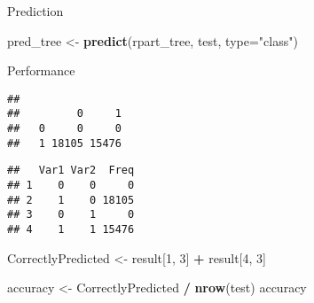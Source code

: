 \documentclass[]{article}
\newenvironment{Shaded}{\begin{snugshade}}{\end{snugshade}}
\newcommand{\KeywordTok}[1]{\textcolor[rgb]{0.13,0.29,0.53}{\textbf{#1}}}
\newcommand{\DataTypeTok}[1]{\textcolor[rgb]{0.13,0.29,0.53}{#1}}
\newcommand{\DecValTok}[1]{\textcolor[rgb]{0.00,0.00,0.81}{#1}}
\newcommand{\StringTok}[1]{\textcolor[rgb]{0.31,0.60,0.02}{#1}}
\newcommand{\OperatorTok}[1]{\textcolor[rgb]{0.81,0.36,0.00}{\textbf{#1}}}
\newcommand{\NormalTok}[1]{#1}
\begin{document}
Prediction

\begin{Shaded}
\begin{Highlighting}[]
\NormalTok{pred_tree <-}\StringTok{ }\KeywordTok{predict}\NormalTok{(rpart_tree, test, }\DataTypeTok{type=}\StringTok{"class"}\NormalTok{)}
\end{Highlighting}
\end{Shaded}

Performance

\begin{Shaded}
\end{Shaded}

\begin{verbatim}
##    
##         0     1
##   0     0     0
##   1 18105 15476
\end{verbatim}

\begin{Shaded}
\end{Shaded}

\begin{verbatim}
##   Var1 Var2  Freq
## 1    0    0     0
## 2    1    0 18105
## 3    0    1     0
## 4    1    1 15476
\end{verbatim}

\begin{Shaded}
\begin{Highlighting}[]
\NormalTok{CorrectlyPredicted <-}\StringTok{ }\NormalTok{result[}\DecValTok{1}\NormalTok{, }\DecValTok{3}\NormalTok{] }\OperatorTok{+}\StringTok{ }\NormalTok{result[}\DecValTok{4}\NormalTok{, }\DecValTok{3}\NormalTok{]}

\NormalTok{accuracy <-}\StringTok{ }\NormalTok{CorrectlyPredicted }\OperatorTok{/}\StringTok{ }\KeywordTok{nrow}\NormalTok{(test)}
\NormalTok{accuracy}
\end{Highlighting}
\end{Shaded}
\end{document}
